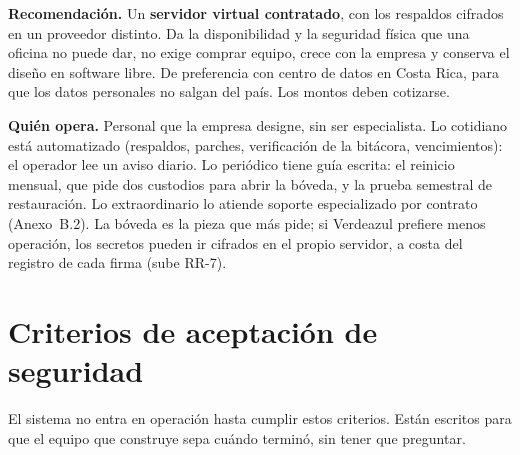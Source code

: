 \documentclass[11pt,letterpaper]{article}
\begin{document}
\begin{decision}
\textbf{Recomendación.} Un \textbf{servidor virtual contratado}, con los respaldos cifrados en un proveedor
distinto. Da la disponibilidad y la seguridad física que una oficina no puede dar, no exige comprar
equipo, crece con la empresa y conserva el diseño en software libre. De preferencia con centro de
datos en Costa Rica, para que los datos personales no salgan del país. Los montos deben cotizarse.
\end{decision}

\textbf{Quién opera.} Personal que la empresa designe, sin ser especialista. Lo cotidiano está
automatizado (respaldos, parches, verificación de la bitácora, vencimientos): el operador lee un
aviso diario. Lo periódico tiene guía escrita: el reinicio mensual, que pide dos custodios para abrir
la bóveda, y la prueba semestral de restauración. Lo extraordinario lo atiende soporte especializado
por contrato (Anexo~B.2). La bóveda es la pieza que más pide; si Verdeazul prefiere menos operación,
los secretos pueden ir cifrados en el propio servidor, a costa del registro de cada firma (sube RR-7).

\section{Criterios de aceptación de seguridad}
\label{sec:aceptacion}

El sistema no entra en operación hasta cumplir estos criterios. Están escritos para que el equipo que
construye sepa cuándo terminó, sin tener que preguntar.
\end{document}
